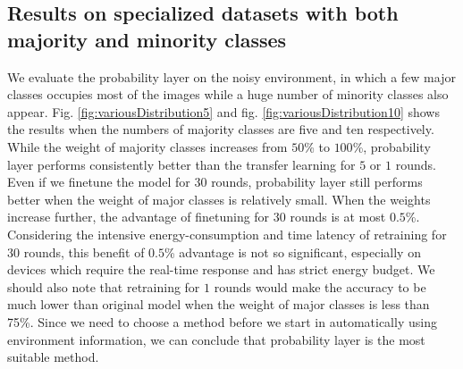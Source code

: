 \documentclass{article}
\begin{document}
\subsection{Results on specialized datasets with both majority and minority classes}
We evaluate the probability layer on the noisy environment, in which a few major classes occupies most of the images while a huge number of minority classes also appear. Fig. \ref{fig:variousDistribution5} and fig. \ref{fig:variousDistribution10} shows the results when the numbers of majority classes are five and ten respectively. While the weight of majority classes increases from $50$\% to $100$\%, probability layer performs consistently better than the transfer learning for $5$ or $1$ rounds. Even if we finetune the model for $30$ rounds, probability layer still performs better when the weight of major classes is relatively small. When the weights increase further, the advantage of finetuning for $30$ rounds is at most $0.5$\%. Considering the intensive energy-consumption and time latency of retraining for $30$ rounds, this benefit of $0.5$\% advantage is not so significant, especially on devices which require the real-time response and has strict energy budget. We should also note that retraining for $1$ rounds would make the accuracy to be much lower than original model when the weight of major classes is less than 75\%. Since we need to choose a method before we start in automatically using environment information, we can conclude that probability layer is the most suitable method.
\end{document}
